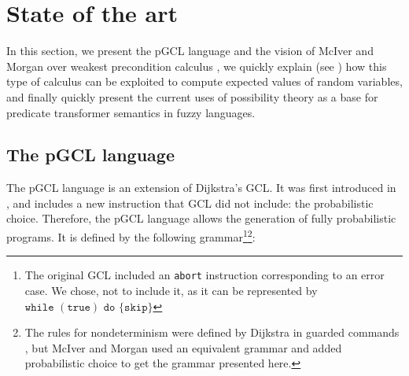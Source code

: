 \documentclass[a4paper,10pt]{llncs}
\begin{document}
%
	
\section{State of the art}
\label{sec:state}
In this section, we present the pGCL language and the vision of McIver and Morgan over weakest precondition calculus \cite{McIver05}, we quickly explain (see \cite{McIver05}) how this type of calculus can be exploited to compute expected values of random variables, and finally quickly present the current uses of possibility theory as a base for predicate transformer semantics in fuzzy languages.

	\subsection{The pGCL language}
	The pGCL language is an extension of Dijkstra's GCL. It was first introduced in \cite{McIver05}, and includes a new instruction that GCL did not include: the probabilistic choice. Therefore, the pGCL language allows the generation of fully probabilistic programs. It is defined by the following grammar\footnote{The original GCL included an \texttt{abort} instruction corresponding to an error case. We chose, not to include it, as it can be represented by $\texttt{while } (\texttt{true}) \texttt{ do }\{ \texttt{skip} \}$}\footnote{The rules for nondeterminism were defined by Dijkstra in guarded commands \cite{Dijkstra76}, but McIver and Morgan used an equivalent grammar and added probabilistic choice to get the grammar presented here. }:\bigskip
\end{document}
